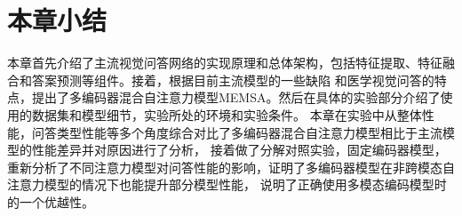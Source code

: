 \section{本章小结}
本章首先介绍了主流视觉问答网络的实现原理和总体架构，包括特征提取、特征融合和答案预测等组件。接着，根据目前主流模型的一些缺陷
和医学视觉问答的特点，提出了多编码器混合自注意力模型MEMSA。然后在具体的实验部分介绍了使用的数据集和模型细节，实验所处的环境和实验条件。
本章在实验中从整体性能，问答类型性能等多个角度综合对比了多编码器混合自注意力模型相比于主流模型的性能差异并对原因进行了分析，
接着做了分解对照实验，固定编码器模型，重新分析了不同注意力模型对问答性能的影响，证明了多编码器模型在非跨模态自注意力模型的情况下也能提升部分模型性能，
说明了正确使用多模态编码模型时的一个优越性。













